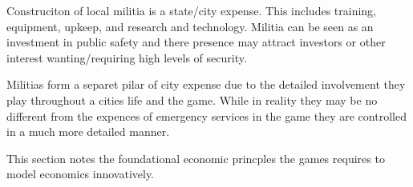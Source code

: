 Construciton of local militia is a state/city expense. This includes training, equipment, upkeep, and research and technology. Militia can be seen as an investment in public safety and there presence may attract investors or other interest wanting/requiring high levels of security.

Militias form a separet pilar of city expense due to the detailed involvement they play throughout a cities life and the game. While in reality they may be no different from the expences of emergency services in the game they are controlled in a much more detailed manner.





































This section notes the foundational economic princples the games requires to model economics innovatively. 



